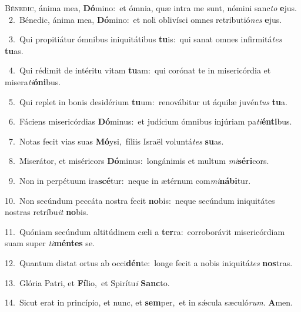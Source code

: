 \lettrine{\initial\textcolor{\initialcolor}{B}}{énedic,} ánima mea, \textbf{Dó}\-mino:~\star et ómnia, quæ intra me sunt, nómini sanc\textit{to} \textbf{e}\-jus.\\
{\numbfont\textcolor{\numbcolor}{~2.}}~Bénedic, ánima mea, \textbf{Dó}\-mino:~\star et noli oblivísci omnes retributió\textit{nes} \textbf{e}\-jus.\par
{\numbfont\textcolor{\numbcolor}{~3.}}~Qui propitiátur ómnibus iniquitátibus \textbf{tu}\-is:~\star qui sanat omnes infirmitá\textit{tes} \textbf{tu}\-as.\par
{\numbfont\textcolor{\numbcolor}{~4.}}~Qui rédimit de intéritu vitam \textbf{tu}\-am:~\star qui corónat te in misericórdia et misera\-\textit{ti}\-\textbf{ó}\textbf{ni}bus.\par
{\numbfont\textcolor{\numbcolor}{~5.}}~Qui replet in bonis desidérium \textbf{tu}\-um:~\star renovábitur ut áquilæ juvén\textit{tus} \textbf{tu}\-a.\par
{\numbfont\textcolor{\numbcolor}{~6.}}~Fáciens misericórdias \textbf{Dó}\-minus:~\star et judícium ómnibus injúriam pa\-\textit{ti}\-\textbf{én}\textbf{ti}bus.\par
{\numbfont\textcolor{\numbcolor}{~7.}}~Notas fecit vias suas \textbf{Mó}\-ysi,~\star fíliis Israël voluntá\textit{tes} \textbf{su}\-as.\par
{\numbfont\textcolor{\numbcolor}{~8.}}~Miserátor, et miséricors \textbf{Dó}\-minus:~\star longánimis et multum \textit{mi}\-\textbf{sé}\textbf{ri}cors.\par
{\numbfont\textcolor{\numbcolor}{~9.}}~Non in perpétuum ira\-\textbf{scé}\-tur:~\star neque in ætérnum com\-\textit{mi}\-\textbf{ná}\textbf{bi}tur.\par
{\numbfont\textcolor{\numbcolor}{10.}}~Non secúndum peccáta nostra fecit \textbf{no}\-bis:~\star neque secúndum iniquitátes nostras retríbu\textit{it} \textbf{no}\-bis.\par
{\numbfont\textcolor{\numbcolor}{11.}}~Quóniam secúndum altitúdinem cæli a \textbf{ter}\-ra:~\star corroborávit misericórdiam suam super \textit{ti}\-\textbf{mén}\textbf{tes} se.\par
{\numbfont\textcolor{\numbcolor}{12.}}~Quantum distat ortus ab occi\-\textbf{dén}\-te:~\star longe fecit a nobis iniquitá\textit{tes} \textbf{nos}\-tras.\par
{\numbfont\textcolor{\numbcolor}{13.}}~Glória Patri, et \textbf{Fí}\-lio,~\star et Spirítu\textit{i} \textbf{Sanc}\-to.\par
{\numbfont\textcolor{\numbcolor}{14.}}~Sicut erat in princípio, et nunc, et \textbf{sem}\-per,~\star et in sǽcula sæculó\-\textit{rum}\-. \textbf{A}\-men.\par
